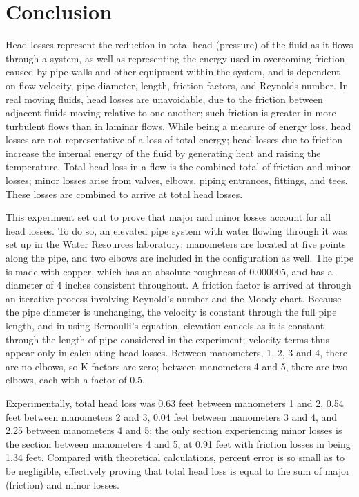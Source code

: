 \documentclass{article}
\begin{document}
\section{Conclusion}
\par Head losses represent the reduction in total head (pressure) of the fluid as it flows through a system, as well as representing the energy used in overcoming friction caused by pipe walls and other equipment within the system, and is dependent on flow velocity, pipe diameter, length, friction factors, and Reynolds number. In real moving fluids, head losses are unavoidable, due to the friction between adjacent fluids moving relative to one another; such friction is greater in more turbulent flows than in laminar flows. While being a measure of energy loss, head losses are not representative of a loss of total energy; head losses due to friction increase the internal energy of the fluid by generating heat and raising the temperature. Total head loss in a flow is the combined total of friction and minor losses; minor losses arise from valves, elbows, piping entrances, fittings, and tees. These losses are combined to arrive at total head losses. \\
\par This experiment set out to prove that major and minor losses account for all head losses. To do so, an elevated pipe system with water flowing through it was set up in the Water Resources laboratory; manometers are located at five points along the pipe, and two elbows are included in the configuration as well. The pipe is made with copper, which has an absolute roughness of 0.000005, and has a diameter of 4 inches consistent throughout. A friction factor is arrived at through an iterative process involving Reynold's number and the Moody chart. Because the pipe diameter is unchanging, the velocity is constant through the full pipe length, and in using Bernoulli's equation, elevation cancels as it is constant through the length of pipe considered in the experiment; velocity terms thus appear only in calculating head losses. Between manometers, 1, 2, 3 and 4, there are no elbows, so K factors are zero; between manometers 4 and 5, there are two elbows, each with a factor of 0.5. \\
\par Experimentally, total head loss was 0.63 feet between manometers 1 and 2, 0.54 feet between manometers 2 and 3, 0.04 feet between manometers 3 and 4, and 2.25 between manometers 4 and 5; the only section experiencing minor losses is the section between manometers 4 and 5, at 0.91 feet with friction losses in being 1.34 feet. Compared with theoretical calculations, percent error is so small as to be negligible, effectively proving that total head loss is equal to the sum of major (friction) and minor losses. \\
\end{document}
